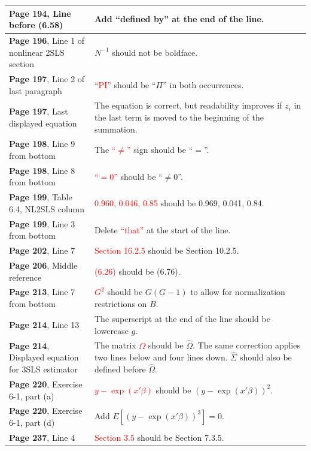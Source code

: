 \documentclass[10pt, a4paper]{article}
\newcommand{\red}[1]{\textcolor{red}{#1}}
\newcommand{\green}[1]{\textcolor{green!50!black}{#1}}
\begin{document}
\begin{longtable}{|R{.41\textwidth}|R{.57\textwidth}|}
	\textbf{Page 194}, Line before (6.58) & Add \green{``defined by''} at the end of the line. \\ \hline
	\textbf{Page 196}, Line 1 of nonlinear 2SLS section \hfill {} & \green{$N^{-1}$} should not be boldface. \\ \hline
	\textbf{Page 197}, Line 2 of last paragraph \hfill {} & \red{``PI''} should be \green{``$\Pi$''} in both occurrences. \\ \hline
	\textbf{Page 197}, Last displayed equation & The equation is correct, but readability improves if \green{$z_i$} in the last term is moved to the beginning of the summation. \\ \hline
	\textbf{Page 198}, Line 9 from bottom & The \red{``$\neq$''} sign should be \green{``$=$''}. \\ \hline
	\textbf{Page 198}, Line 8 from bottom & \red{``$=0$''} should be \green{``$\neq 0$''}. \\ \hline
	\textbf{Page 199}, Table 6.4, NL2SLS column & \red{0.960, 0.046, 0.85} should be \green{0.969, 0.041, 0.84}. \\ \hline
	\textbf{Page 199}, Line 3 from bottom & Delete \red{``that''} at the start of the line. \\ \hline
	\textbf{Page 202}, Line 7  & \red{Section 16.2.5} should be \green{Section 10.2.5}. \\ \hline
	\textbf{Page 206}, Middle reference & \red{(6.26)} should be \green{(6.76)}. \\ \hline
	\textbf{Page 213}, Line 7 from bottom & \red{$G^2$} should be \green{$G(G-1)$} to allow for normalization restrictions on $B$. \\ \hline
	\textbf{Page 214}, Line 13 & The superscript at the end of the line should be lowercase \green{$g$}. \\ \hline
	\textbf{Page 214}, Displayed equation for 3SLS estimator & The matrix \red{$\Omega$} should be \green{$\widehat{\Omega}$}. The same correction applies two lines below and four lines down. \green{$\widehat{\Sigma}$} should also be defined before \green{$\widehat{\Omega}$}. \\ \hline
	\textbf{Page 220}, Exercise 6-1, part (a) & \red{$y-\exp(x'\beta)$} should be \green{$(y-\exp(x'\beta))^2$}. \\ \hline
	\textbf{Page 220}, Exercise 6-1, part (d) & Add \green{$E[(y-\exp(x'\beta))^3]=0$}. \\ \hline
	\textbf{Page 237}, Line 4 & \red{Section 3.5} should be \green{Section 7.3.5}. \\ \hline

\end{longtable}
\end{document}
